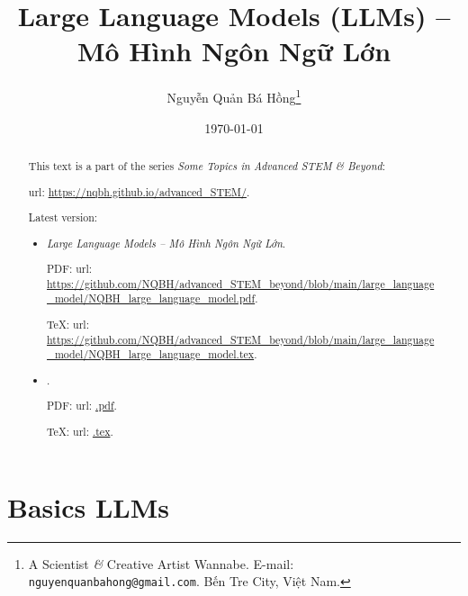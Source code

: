 \documentclass{article}
\title{Large Language Models (LLMs) -- Mô Hình Ngôn Ngữ Lớn}
\author{Nguyễn Quản Bá Hồng\footnote{A Scientist {\it\&} Creative Artist Wannabe. E-mail: {\tt nguyenquanbahong@gmail.com}. Bến Tre City, Việt Nam.}}
\date{\today}
\begin{document}
\maketitle
\begin{abstract}
	This text is a part of the series {\it Some Topics in Advanced STEM \& Beyond}:
	
	{\sc url}: \url{https://nqbh.github.io/advanced_STEM/}.
	
	Latest version:
	\begin{itemize}
		\item {\it Large Language Models -- Mô Hình Ngôn Ngữ Lớn}.
		
		PDF: {\sc url}: \url{https://github.com/NQBH/advanced_STEM_beyond/blob/main/large_language_model/NQBH_large_language_model.pdf}.
		
		\TeX: {\sc url}: \url{https://github.com/NQBH/advanced_STEM_beyond/blob/main/large_language_model/NQBH_large_language_model.tex}.
		\item {\it }.
		
		PDF: {\sc url}: \url{.pdf}.
		
		\TeX: {\sc url}: \url{.tex}.
	\end{itemize}
\end{abstract}
\tableofcontents


\section{Basics LLMs}
\end{document}
